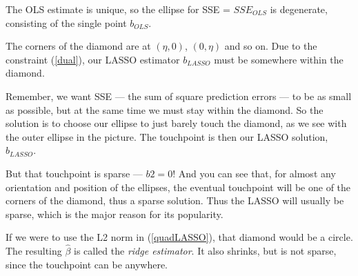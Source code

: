 The OLS estimate is unique, so the ellipse for SSE = $SSE_{OLS}$ is
degenerate, consisting of the single point $b_{OLS}$.

The corners of the diamond are at $(\eta,0)$, $(0,\eta)$ and so on.  Due
to the constraint (\ref{dual}), our LASSO estimator $b_{LASSO}$
must be somewhere within the diamond.

Remember, we want SSE --- the sum of square prediction errors --- to be
as small as possible, but at the same time we must stay within the
diamond.  So the solution is to choose our ellipse to just barely touch
the diamond, as we see with the outer ellipse in the picture.  The
touchpoint is then our LASSO solution, $b_{LASSO}$.

But that touchpoint is sparse --- $b2 = 0$!  And you can see that, for
almost any orientation and position of the ellipses, the eventual
touchpoint will be one of the corners of the diamond, thus a sparse
solution.  Thus the LASSO will usually be sparse, which is the major
reason for its popularity.

If we were to use the L2 norm in (\ref{quadLASSO}), that diamond would
be a circle.  The resulting $\widehat{\beta}$ is called the
\textit{ridge estimator}.  It also shrinks, but is not sparse, since the
touchpoint can be anywhere.
